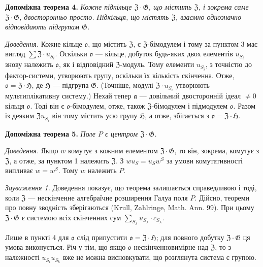 \documentclass[11pt]{article}
\begin{document}
\noindent\textbf{Допоміжна теорема 4.} \emph{Кожне підкільце \(\mathfrak Z\cdot\mathfrak G\), що містить \(\mathfrak Z\), і зокрема саме \(\mathfrak Z\cdot\mathfrak G\), двосторонньо просто. Підкільця, що містять \(\mathfrak Z\), взаємно однозначно відповідають підгрупам \(\mathfrak G\).}

\noindent\emph{Доведення.} Кожне кільце \(\mathfrak o\), що містить \(\mathfrak Z\), є \(\mathfrak Z\)-бімодулем і тому за пунктом 3 має вигляд \(\sum\mathfrak Z\cdot u_{S_i}\). Оскільки \(\mathfrak o\) --- кільце, добуток будь-яких двох елементів \(u_{S_i}\) знову належить \(\mathfrak o\), як і відповідний \(\mathfrak Z\)-модуль. Тому елементи \(u_{S_i}\), з точністю до фактор-системи, утворюють групу, оскільки їх кількість скінченна. Отже, \(\mathfrak o=\mathfrak Z\cdot\mathfrak H\), де \(\mathfrak H\) --- підгрупа \(\mathfrak G\). (Точніше, модулі \(\mathfrak Z\cdot u_{S_i}\) утворюють мультиплікативну систему.) Нехай тепер \(\mathfrak a\) --- довільний двосторонній ідеал \(\neq0\) кільця \(\mathfrak o\). Тоді він є \(\mathfrak o\)-бімодулем, отже, також \(\mathfrak Z\)-бімодулем і підмодулем \(\mathfrak o\). Разом із деяким \(\mathfrak Zu_{S_i}\) він тому містить усю групу \(\mathfrak H\), а отже, збігається з \(\mathfrak o=\mathfrak Z\cdot\mathfrak H\).

\noindent\textbf{Допоміжна теорема 5.} \emph{Поле \(P\) є центром \(\mathfrak Z\cdot\mathfrak G\).}

\noindent\emph{Доведення.} Якщо \(w\) комутує з кожним елементом \(\mathfrak Z\cdot\mathfrak G\), то він, зокрема, комутує з \(\mathfrak Z\), а отже, за пунктом 1 належить \(\mathfrak Z\). З \(wu_S=u_Sw^S\) за умови комутативності випливає \(w=w^S\). Тому \(w\) належить \(P\).

\noindent\emph{Зауваження 1.} Доведення показує, що теорема залишається справедливою і тоді, коли \(\mathfrak Z\) --- нескінченне алгебраїчне розширення Галуа поля \(P\). Дійсно, теореми про повну зводність зберігаються (Krull, Zahlringe, Math. Ann. 99). При цьому \(\mathfrak Z\cdot\mathfrak G\) є системою всіх скінченних сум \(\sum_{S_\lambda}u_{S_\lambda}\cdot c_{S_\lambda}\).

Лише в пункті 4 для \(\mathfrak o\) слід припустити \(\mathfrak o=\mathfrak Z\cdot\mathfrak H\); для повного добутку \(\mathfrak Z\cdot\mathfrak G\) ця умова виконується. Річ у тім, що якщо \(\mathfrak o\) нескінченновимірне над \(\mathfrak Z\), то з належності \(u_{S_i}u_{S_k}\) вже не можна висновкувати, що розглянута система є групою.
\end{document}
